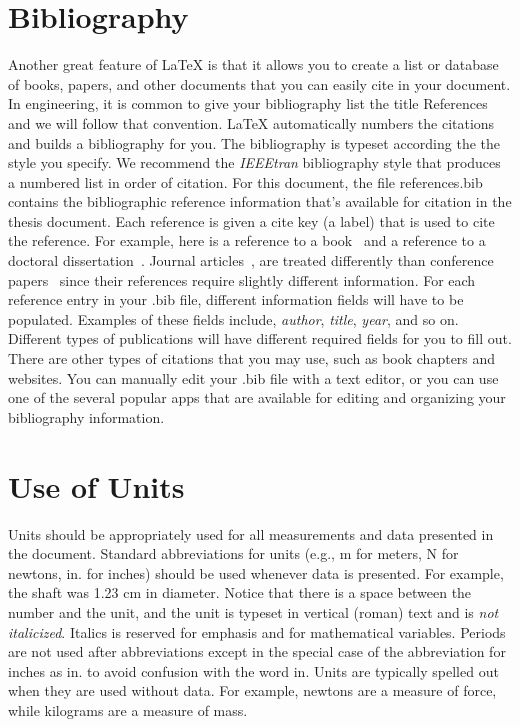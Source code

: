 \section{Bibliography}
Another great feature of \LaTeX{} is that it allows you to create a list or database of books, papers, and other documents that you can easily cite in your document. In engineering, it is common to give your bibliography list the title References and we will follow that convention. \LaTeX{} automatically numbers the citations and builds a bibliography for you. The bibliography is typeset according the the style you specify. We recommend the {\em IEEEtran} bibliography style that produces a numbered list in order of citation. For this document, the file {\ttfamily references.bib} contains the bibliographic reference information that's available for citation in the thesis document. Each reference is given a cite key (a label) that is used to cite the reference. For example, here is a reference to a book~\autocite{book1} and a reference to a doctoral dissertation~\autocite{doctoral1}. Journal articles~\autocite{journal1}, are treated differently than conference papers~\autocite{conference1} since their references require slightly different information. For each reference entry in your {\ttfamily .bib} file, different information fields will have to be populated. Examples of these fields include, {\em author}, {\em title}, {\em year}, and so on. Different types of publications will have different required fields for you to fill out. There are other types of citations that you may use, such as book chapters and websites. You can manually edit your {\ttfamily .bib} file with a text editor, or you can use one of the several popular apps that are available for editing and organizing your bibliography information.

\section{Use of Units}
Units should be appropriately used for all measurements and data presented in the document. Standard abbreviations for units (e.g., m for meters, N for newtons, in. for inches) should be used whenever data is presented. For example, the shaft was 1.23 cm in diameter. Notice that there is a space between the number and the unit, and the unit is typeset in vertical (roman) text and is {\em not italicized}. Italics is reserved for emphasis and for mathematical variables. Periods are not used after abbreviations except in the special case of the abbreviation for inches as in. to avoid confusion with the word in. Units are typically spelled out when they are used without data. For example, newtons are a measure of force, while kilograms are a measure of mass.


